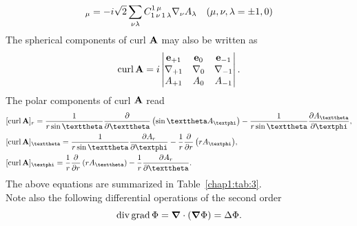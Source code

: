 \begin{equation}
[\curl  \vect{A}]_{\mu}=-i \sqrt{2} \sum_{\nu \lambda} \clebsch{1}{\nu}{1}{\lambda}{1}{\mu} \nabla_{\nu} A_{\lambda} \quad(\mu, \nu, \lambda= \pm 1,0) \label{eq:1:3:29}
\end{equation}
The spherical components of curl \(\mathbf{A}\) may also be written as
\begin{equation}
\operatorname{curl}  \mathbf{A}=i\begin{vmatrix}
\mathbf{e}_{+1} & \mathbf{e}_{0} & \mathbf{e}_{-1}  \label{eq:1:3:30}\\
\nabla_{+1} & \nabla_{0} & \nabla_{-1} \\
A_{+1} & A_{0} & A_{-1}
\end{vmatrix} .
\end{equation}
The polar components of curl \(\mathbf{A}\) read
\begin{align}
& {[\curl  \vect{A}]_{r}=\frac{1}{r \sin \vartheta} \frac{\partial}{\partial \vartheta}\left(\sin \vartheta A_{\varphi}\right)-\frac{1}{r \sin \vartheta} \frac{\partial A_{\vartheta}}{\partial \varphi}} , \notag\\
& {[\curl  \vect{A}]_{\vartheta}=\frac{1}{r \sin \vartheta} \frac{\partial A_{r}}{\partial \varphi}-\frac{1}{r} \frac{\partial}{\partial r}\left(r A_{\varphi}\right)} , \label{eq:1:3:31}\\
& {[\curl  \vect{A}]_{\varphi}=\frac{1}{r} \frac{\partial}{\partial r}\left(r A_{\vartheta}\right)-\frac{1}{r} \frac{\partial A_{r}}{\partial \vartheta}} .\notag
\end{align}
The above equations are summarized in Table~\ref{chap1:tab:3}.\\
Note also the following differential operations of the second order
\begin{equation}
\operatorname{div}  \operatorname{grad}  \Phi=\boldsymbol{\nabla} \cdot(\boldsymbol{\nabla} \Phi)=\Delta \Phi \label{eq:1:3:32}.
\end{equation}
